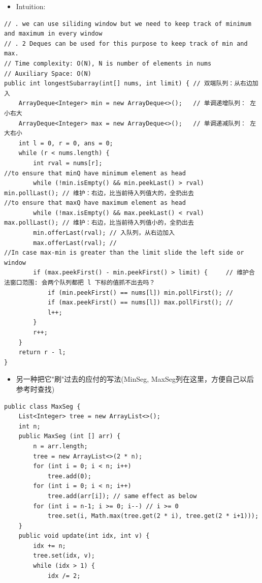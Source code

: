 \documentclass[9pt, b5paaper]{book}
\begin{document}
\begin{enumerate}
\begin{itemize}
\item Intuition:
\end{itemize}
\begin{verbatim}
// . we can use siliding window but we need to keep track of minimum and maximum in every window 
// . 2 Deques can be used for this purpose to keep track of min and max.
// Time complexity: O(N), N is number of elements in nums
// Auxiliary Space: O(N)
public int longestSubarray(int[] nums, int limit) { // 双端队列：从右边加入
    ArrayDeque<Integer> min = new ArrayDeque<>();   // 单调递增队列： 左小右大
    ArrayDeque<Integer> max = new ArrayDeque<>();   // 单调递减队列： 左大右小
    int l = 0, r = 0, ans = 0;
    while (r < nums.length) {
        int rval = nums[r];
//to ensure that minQ have minimum element as head             
        while (!min.isEmpty() && min.peekLast() > rval) min.pollLast(); // 维护：右边，比当前待入列值大的，全扔出去
//to ensure that maxQ have maximum element as head                
        while (!max.isEmpty() && max.peekLast() < rval) max.pollLast(); // 维护：右边，比当前待入列值小的，全扔出去                
        min.offerLast(rval); // 入队列，从右边加入
        max.offerLast(rval); // 
//In case max-min is greater than the limit slide the left side or window         
        if (max.peekFirst() - min.peekFirst() > limit) {     // 维护合法窗口范围: 会两个队列都把 l 下标的值抓不出去吗？
            if (min.peekFirst() == nums[l]) min.pollFirst(); // 
            if (max.peekFirst() == nums[l]) max.pollFirst(); // 
            l++;
        }
        r++;
    }
    return r - l;
}
\end{verbatim}
\begin{itemize}
\item 另一种把它"刷"过去的应付的写法(MinSeg, MaxSeg列在这里，方便自己以后参考时查找)
\end{itemize}
\begin{verbatim}
public class MaxSeg {
    List<Integer> tree = new ArrayList<>();
    int n;
    public MaxSeg (int [] arr) {
        n = arr.length;
        tree = new ArrayList<>(2 * n);
        for (int i = 0; i < n; i++)
            tree.add(0);
        for (int i = 0; i < n; i++)
            tree.add(arr[i]); // same effect as below
        for (int i = n-1; i >= 0; i--) // i >= 0
            tree.set(i, Math.max(tree.get(2 * i), tree.get(2 * i+1)));
    }
    public void update(int idx, int v) {
        idx += n;
        tree.set(idx, v);
        while (idx > 1) {
            idx /= 2;

\end{verbatim}
\end{enumerate}
\end{document}
